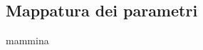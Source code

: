 \subsection{Mappatura dei parametri}
\label{sec:chapter_baking_service_pipeline_baking_mapp_parametri}
mammina